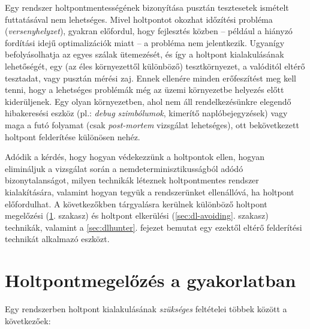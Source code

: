     Egy rendszer holtpontmentességének bizonyítása pusztán tesztesetek ismételt futtatásával nem lehetséges. Mivel holtpontot okozhat időzítési probléma (\emph{versenyhelyzet}), gyakran előfordul, hogy fejlesztés közben -- például a hiányzó fordítási idejű optimalizációk miatt -- a probléma nem jelentkezik. Ugyanígy befolyásolhatja az egyes szálak ütemezését, és így a holtpont kialakulásának lehetőségét, egy (az éles környezettől különböző) tesztkörnyezet, a valóditól eltérő tesztadat, vagy pusztán mérési zaj. Ennek ellenére minden erőfeszítést meg kell tenni, hogy a lehetséges problémák még az üzemi környezetbe helyezés előtt kiderüljenek. Egy olyan környezetben, ahol nem áll rendelkezésünkre elegendő hibakeresési eszköz (pl.: \emph{debug szimbólumok}, kimerítő naplóbejegyzések) vagy maga a futó folyamat (csak \emph{post-mortem} vizsgálat lehetséges), ott bekövetkezett holtpont felderítése különösen nehéz.
    
    Adódik a kérdés, hogy hogyan védekezzünk a holtpontok ellen, hogyan elimináljuk a vizsgálat során a nemdeterminisztikusságból adódó bizonytalanságot, milyen technikák léteznek holtpontmentes rendszer kialakítására, valamint hogyan tegyük a rendszerünket ellenállóvá, ha holtpont előfordulhat. A következőkben tárgyalásra kerülnek különböző holtpont megelőzési (\ref{sec:dl-prevention}. szakasz) és holtpont elkerülési (\ref{sec:dl-avoiding}. szakasz) technikák, valamint a \ref{sec:dlhunter}. fejezet bemutat egy ezektől eltérő felderítési technikát alkalmazó eszközt.

\section{Holtpontmegelőzés a gyakorlatban} 
\label{sec:dl-prevention}
    Egy rendszerben holtpont kialakulásának \emph{szükséges} feltételei többek között a következőek:
    
